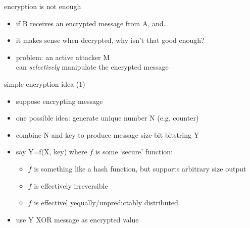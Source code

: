 \begin{frame}{encryption is not enough}
    \begin{itemize}
    \item if B receives an encrypted message from A, and\ldots
    \item it makes sense when decrypted, why isn't that good enough?
    \vspace{.5cm}
    \item problem: an active attacker M \\
        can \textit{selectively} manipulate the encrypted message
    \end{itemize}
\end{frame}

\begin{frame}{simple encryption idea (1)}
    \begin{itemize}
    \item suppose encrypting message
    \item one possible idea: generate unique number N (e.g. counter)
    \item combine N and key to produce message size-bit bitstring Y
    \item say Y=f(X, key) where $f$ is some `secure' function:
        \begin{itemize}
        \item $f$ is something like a hash function, but supports arbitrary size output
        \item $f$ is effectively irreversible
        \item $f$ is effectivel yequally/unpredictably distributed 
        \end{itemize}
    \item use Y XOR message as encrypted value
    \end{itemize}
\end{frame}

